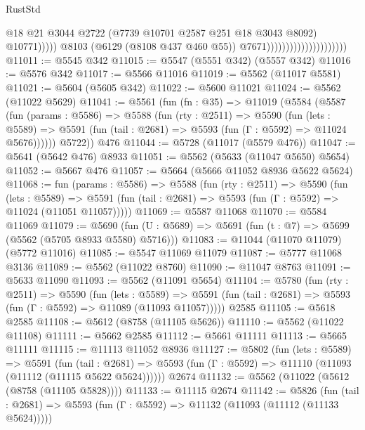 \begin{lexlean}{RustStd}
\begin{coremodule}
                                                        @18
                                                        @21
                                                        @3044
                                                        @2722
                                                        (@7739 @10701 @2587 @251 @18 @3043 @8092)
                                                        @10771)))))
                                              @8103
                                              (@6129 (@8108 @437 @460 @55))
                                              @7671)))))))))))))))))))))
@11011 := @5545 @342
@11015 := @5547 (@5551 @342) (@5557 @342)
@11016 := @5576 @342
@11017 := @5566 @11016
@11019 := @5562 (@11017 @5581)
@11021 := @5604 (@5605 @342)
@11022 := @5600 @11021
@11024 := @5562 (@11022 @5629)
@11041 := @5561
    (fun (fn : @35) =>
    @11019
      (@5584
        (@5587
          (fun (params : @5586) =>
          @5588
            (fun (rty : @2511) =>
            @5590
              (fun (lets : @5589) =>
              @5591 (fun (tail : @2681) => @5593 (fun (Γ : @5592) => @11024 @5676))))))
        @5722))
    @476
@11044 := @5728 (@11017 (@5579 @476))
@11047 := @5641 (@5642 @476) @8933
@11051 := @5562 (@5633 (@11047 @5650) @5654)
@11052 := @5667 @476
@11057 := @5664 (@5666 @11052 @8936 @5622 @5624)
@11068 := fun (params : @5586) =>
  @5588
    (fun (rty : @2511) =>
    @5590
      (fun (lets : @5589) =>
      @5591 (fun (tail : @2681) => @5593 (fun (Γ : @5592) => @11024 (@11051 @11057)))))
@11069 := @5587 @11068
@11070 := @5584 @11069
@11079 := @5690 (fun (U : @5689) => @5691 (fun (t : @7) => @5699 (@5562 (@5705 @8933 @5580) @5716)))
@11083 := @11044 (@11070 @11079) (@5772 @11016)
@11085 := @5547 @11069 @11079
@11087 := @5777 @11068 @3136
@11089 := @5562 (@11022 @8760)
@11090 := @11047 @8763
@11091 := @5633 @11090
@11093 := @5562 (@11091 @5654)
@11104 := @5780
    (fun (rty : @2511) =>
    @5590
      (fun (lets : @5589) =>
      @5591 (fun (tail : @2681) => @5593 (fun (Γ : @5592) => @11089 (@11093 @11057)))))
    @2585
@11105 := @5618 @2585
@11108 := @5612 (@8758 (@11105 @5626))
@11110 := @5562 (@11022 @11108)
@11111 := @5662 @2585
@11112 := @5661 @11111
@11113 := @5665 @11111
@11115 := @11113 @11052 @8936
@11127 := @5802
    (fun (lets : @5589) =>
    @5591
      (fun (tail : @2681) =>
      @5593 (fun (Γ : @5592) => @11110 (@11093 (@11112 (@11115 @5622 @5624))))))
    @2674
@11132 := @5562 (@11022 (@5612 (@8758 (@11105 @5828))))
@11133 := @11115 @2674
@11142 := @5826
    (fun (tail : @2681) => @5593 (fun (Γ : @5592) => @11132 (@11093 (@11112 (@11133 @5624)))))

\end{coremodule}
\end{lexlean}
